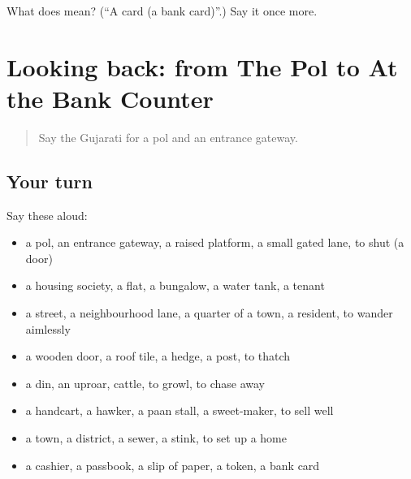 \begin{tcolorbox}[breakable,colback=teal!4,colframe=teal!35!black,title={Before you move on}]
What does  mean? (\textquotedblleft{}A card (a bank card)\textquotedblright{}.) Say it once more.
\end{tcolorbox}
\section[(dialogue)]{Looking back: from The Pol to At the Bank Counter}

\label{lesson:GU-R424-review-417-424}



\begin{quote}
Say the Gujarati for a pol and an entrance gateway.
\end{quote}

\subsection*{Your turn}
Say these aloud:

\begin{itemize}
\raggedright
  \item a pol, an entrance gateway, a raised platform, a small gated lane, to shut (a door)
  \item a housing society, a flat, a bungalow, a water tank, a tenant
  \item a street, a neighbourhood lane, a quarter of a town, a resident, to wander aimlessly
  \item a wooden door, a roof tile, a hedge, a post, to thatch
  \item a din, an uproar, cattle, to growl, to chase away
  \item a handcart, a hawker, a paan stall, a sweet-maker, to sell well
  \item a town, a district, a sewer, a stink, to set up a home
  \item a cashier, a passbook, a slip of paper, a token, a bank card
\end{itemize}

